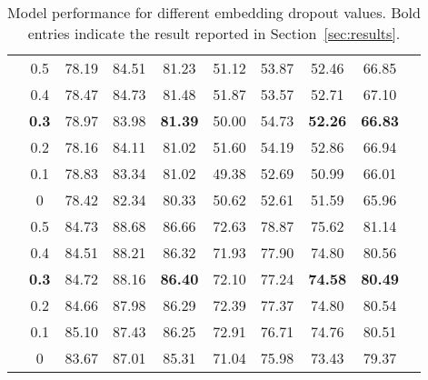 \documentclass[review]{elsarticle}
\newcommand{\secref}[1]{Section~\ref{#1}}
\begin{document}
\begin{table}[htp]
{\begin{tabular}{@{\extracolsep{4pt}}cccccccccc@{}}
&0.5&78.19  &84.51 & 81.23  & 51.12 & 53.87 & 52.46 & 66.85 \\
&0.4 & 78.47 & 84.73 &81.48 & 51.87 & 53.57 & 52.71 & 67.10\\
&\textbf{0.3}  &78.97&  83.98       &\textbf{81.39}     &50.00&54.73&\textbf{52.26}& \textbf{66.83}  \\
&0.2&78.16 &84.11 & 81.02  & 51.60 & 54.19 & 52.86 & 66.94  \\
& 0.1&  78.83 & 83.34 &81.02 & 49.38 & 52.69 & 50.99 & 66.01\\  
& 0&  78.42 & 82.34 & 80.33 & 50.62 & 52.61 & 51.59 & 65.96 
\\
 \midrule
\parbox[c]{5mm}{}

&0.5& 84.73 & 88.68 & 86.66    &72.63 & 78.87  & 75.62     & 81.14
  \\
&0.4 &  84.51 & 88.21  & 86.32   & 71.93 & 77.90  & 74.80  &80.56
\\
&\textbf{0.3}  & 84.72 & 88.16  &\textbf{86.40}    &72.10 &77.24&\textbf{74.58} & \textbf{80.49} \\
& 0.2&  84.66 &87.98   &86.29    & 72.39 & 77.37  &74.80   & 80.54\\ 
& 0.1&85.10  &87.43  &86.25    &72.91 & 76.71 & 74.76    & 80.51\\ 
& 0&  83.67 & 87.01  & 85.31   &71.04 &75.98  & 73.43  & 79.37\\







     
\bottomrule
\end{tabular}
 }
\caption{Model performance for different embedding dropout values.
Bold entries indicate the result reported in \secref{sec:results}.}
\label{tab:embedding_dropout}
 \end{table}
 
 
\end{document}

